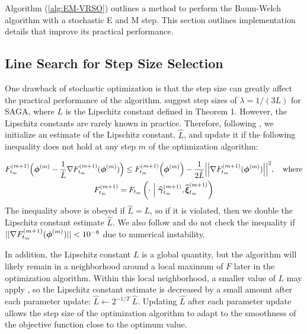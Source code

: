 
Algorithm (\ref{alg:EM-VRSO}) outlines a method to perform the Baum-Welch algorithm with a stochastic E and M step. This section outlines implementation details that improve its practical performance.

\subsection{Line Search for Step Size Selection}
\label{subsec:est_L}

One drawback of stochastic optimization is that the step size can greatly affect the practical performance of the algorithm. %
\citet{Defazio:2014} suggest step sizes of $\lambda = 1/(3L)$ for SAGA, where $L$ is the Lipschitz constant defined in Theorem 1. However, the Lipschitz constants are rarely known in practice. Therefore, following \citet{Schmidt:2017}, we initialize an estimate of the Lipschitz constant, $\hat L$, and update it if the following inequality does not hold at any step $m$ of the optimization algorithm:

\begin{gather}
    F^{(m+1)}_{t_m}\Big(\boldsymbol{\phi}^{(m)} - \frac{1}{\hat L} \nabla F_{t_m}^{(m+1)}(\boldsymbol{\phi}^{(m)}) \Big) \leq F^{(m+1)}_{t_m}\Big(\boldsymbol{\phi}^{(m)}\Big) - \frac{1}{2 \hat L} \Big| \Big| \nabla F_{t_m}^{(m+1)}(\boldsymbol{\phi}^{(m)})  \Big| \Big| ^2, \quad \text{where} \label{ineq:F} \\
    F_{t_m}^{(m+1)} = F_{t_m}\left(\cdot ~ \Big | ~ \widehat {\boldsymbol{\gamma}}^{(m+1)}_{t_m}, \widehat {\boldsymbol{\xi}}^{(m+1)}_{t_m}\right)
    \label{ineq:F}
\end{gather}
%
The inequality above is obeyed if $\hat L = L$, so if it is violated, then we double the Lipschitz constant estimate $\hat L$. We also follow \citet{Schmidt:2017} and do not check the inequality if $|| \nabla F_{t_m}^{(m+1)}(\boldsymbol{\phi}^{(m)})|| < 10^{-8}$ due to numerical instability. 

In addition, the Lipschitz constant $L$ is a global quantity, but the algorithm will likely remain in a neighborhood around a local maximum of $F$ later in the optimization algorithm. Within this local neighborhood, a smaller value of $L$ may apply \citep{Schmidt:2017}, so the Lipschitz constant estimate is decreased by a small amount after each parameter update:
%
$\hat L \leftarrow 2^{-1/T} ~ \hat L$.
%
Updating $\hat L$ after each parameter update allows the step size of the optimization algorithm to adapt to the smoothness of the objective function close to the optimum value.

